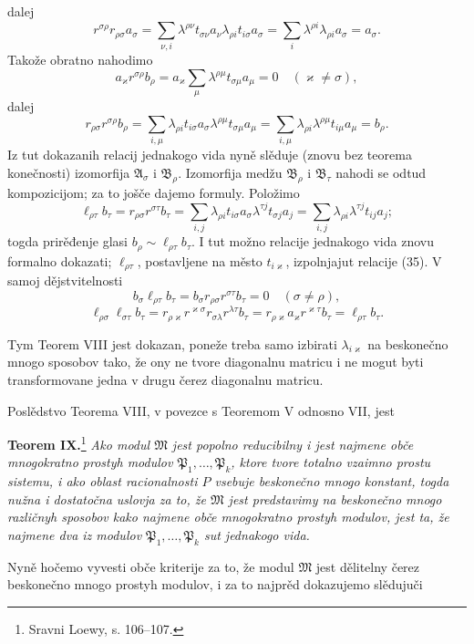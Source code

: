 \documentclass[11pt]{article}
\begin{document}
dalej
\[
 r^{\sigma\rho}r_{\rho\sigma}a_\sigma
 =\sum_{\nu,i}\lambda^{\rho\nu}t_{\sigma\nu}a_\nu\lambda_{\rho i}t_{i\sigma}a_\sigma
 =\sum_i\lambda^{\rho i}\lambda_{\rho i}a_\sigma=a_\sigma.
\]
Takože obratno nahodimo
\[
 a_\varkappa r^{\sigma\rho}b_\rho
 =a_\varkappa\sum_\mu\lambda^{\rho\mu}t_{\sigma\mu}a_\mu=0
 \quad(\varkappa\ne\sigma),
\]
dalej
\[
 r_{\rho\sigma}r^{\sigma\rho}b_\rho
 =\sum_{i,\mu}\lambda_{\rho i}t_{i\sigma}a_\sigma\lambda^{\rho\mu}t_{\sigma\mu}a_\mu
 =\sum_{i,\mu}\lambda_{\rho i}\lambda^{\rho\mu}t_{i\mu}a_\mu=b_\rho.
\]
Iz tut dokazanih relacij jednakogo vida nyně slěduje (znovu bez teorema konečnosti) izomorfija \(\mathfrak A_\sigma\) i \(\mathfrak B_\rho\). Izomorfija medžu \(\mathfrak B_\rho\) i \(\mathfrak B_\tau\) nahodi se odtud kompozicijom; za to jošče dajemo formuly. Položimo
\[
 \ell_{\rho\tau}b_\tau=r_{\rho\sigma}r^{\sigma\tau}b_\tau
 =\sum_{i,j}\lambda_{\rho i}t_{i\sigma}a_\sigma\lambda^{\tau j}t_{\sigma j}a_j
 =\sum_{i,j}\lambda_{\rho i}\lambda^{\tau j}t_{ij}a_j;
\]
togda prirěđenje glasi \(b_\rho\sim\ell_{\rho\tau}b_\tau\). I tut možno relacije jednakogo vida znovu formalno dokazati; \(\ell_{\rho\tau}\), postavljene na město \(t_{i\varkappa}\), izpolnjajut relacije (35). V samoj dějstvitelnosti
\[
 b_\sigma\ell_{\rho\tau}b_\tau=b_\sigma r_{\rho\sigma}r^{\sigma\tau}b_\tau=0\quad(\sigma\ne\rho),
\]
\[
 \ell_{\rho\sigma}\ell_{\sigma\tau}b_\tau=r_{\rho\varkappa}r^{\varkappa\sigma}r_{\sigma\lambda}r^{\lambda\tau}b_\tau
 =r_{\rho\varkappa}a_\varkappa r^{\varkappa\tau}b_\tau=\ell_{\rho\tau}b_\tau.
\]

Tym Teorem VIII jest dokazan, poneže treba samo izbirati \(\lambda_{i\varkappa}\) na beskonečno mnogo sposobov tako, že ony ne tvore diagonalnu matricu i ne mogut byti transformovane jedna v drugu čerez diagonalnu matricu.

Poslědstvo Teorema VIII, v povezce s Teoremom V odnosno VII, jest

\textbf{Teorem IX.}\footnote{Sravni Loewy, s. 106--107.} \textit{Ako modul \(\mathfrak M\) jest popolno reducibilny i jest najmene obče mnogokratno prostyh modulov \(\mathfrak P_1,
\ldots,
\mathfrak P_k\), ktore tvore totalno vzaimno prostu sistemu, i ako oblast racionalnosti \(P\) vsebuje beskonečno mnogo konstant, togda nužna i dostatočna uslovja za to, že \(\mathfrak M\) jest predstavimy na beskonečno mnogo različnyh sposobov kako najmene obče mnogokratno prostyh modulov, jest ta, že najmene dva iz modulov \(\mathfrak P_1,
\ldots,
\mathfrak P_k\) sut jednakogo vida.}

Nyně hočemo vyvesti obče kriterije za to, že modul \(\mathfrak M\) jest dělitelny čerez beskonečno mnogo prostyh modulov, i za to najprěd dokazujemo slědujuči
\end{document}
